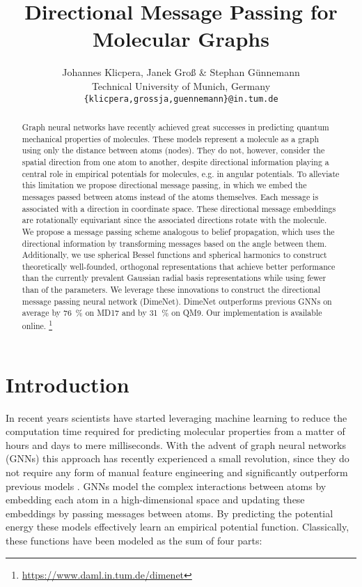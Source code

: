 \documentclass{article} \usepackage{iclr2020_conference,times}
\title{Directional Message Passing for Molecular Graphs}
\author{Johannes Klicpera, Janek Groß \& Stephan Günnemann\\
Technical University of Munich, Germany\\
\texttt{\{klicpera,grossja,guennemann\}@in.tum.de}
}
\begin{document}
\maketitle

\begin{abstract}
    Graph neural networks have recently achieved great successes in predicting quantum mechanical properties of molecules. These models represent a molecule as a graph using only the distance between atoms (nodes). They do not, however, consider the spatial direction from one atom to another, despite directional information playing a central role in empirical potentials for molecules, e.g. in angular potentials. To alleviate this limitation we propose directional message passing, in which we embed the messages passed between atoms instead of the atoms themselves. Each message is associated with a direction in coordinate space. These directional message embeddings are rotationally equivariant since the associated directions rotate with the molecule. We propose a message passing scheme analogous to belief propagation, which uses the directional information by transforming messages based on the angle between them. Additionally, we use spherical Bessel functions and spherical harmonics to construct theoretically well-founded, orthogonal representations that achieve better performance than the currently prevalent Gaussian radial basis representations while using fewer than  of the parameters. We leverage these innovations to construct the directional message passing neural network (DimeNet). DimeNet outperforms previous GNNs on average by \SI{76}{\percent} on MD17 and by \SI{31}{\percent} on QM9. Our implementation is available online. \footnote{\url{https://www.daml.in.tum.de/dimenet}}
\end{abstract}

\section{Introduction}

In recent years scientists have started leveraging machine learning to reduce the computation time required for predicting molecular properties from a matter of hours and days to mere milliseconds. With the advent of graph neural networks (GNNs) this approach has recently experienced a small revolution, since they do not require any form of manual feature engineering and significantly outperform previous models \citep{gilmer_neural_2017,schutt_schnet:_2017}. GNNs model the complex interactions between atoms by embedding each atom in a high-dimensional space and updating these embeddings by passing messages between atoms. By predicting the potential energy these models effectively learn an empirical potential function. Classically, these functions have been modeled as the sum of four parts: \citep{leach_molecular_2001}
\end{document}
